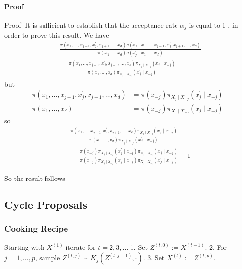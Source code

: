 \documentclass{article}
\begin{document}
\paragraph{Proof}
Proof. It is sufficient to establish that the acceptance rate $\alpha_j$ is equal to 1 , in order to prove this result. We have
$$
\begin{aligned}
& \frac{\pi\left(x_1, \ldots, x_{j-1}, x_j^{\prime}, x_{j+1}, \ldots, x_d\right) q\left(x_j \mid x_1, \ldots, x_{j-1}, x_j^{\prime}, x_{j+1}, \ldots, x_d\right)}{\pi\left(x_1, \ldots, x_d\right) q\left(x_j^{\prime} \mid x_1, \ldots, x_d\right)} \\
& =\frac{\pi\left(x_1, \ldots, x_{j-1}, x_j^{\prime}, x_{j+1}, \ldots, x_d\right) \pi_{X_j \mid X_{-j}}\left(x_j \mid x_{-j}\right)}{\pi\left(x_1, \ldots, x_d\right) \pi_{X_j \mid X_{-j}}\left(x_j^{\prime} \mid x_{-j}\right)}
\end{aligned}
$$
but
$$
\begin{aligned}
\pi\left(x_1, \ldots, x_{j-1}, x_j^{\prime}, x_{j+1}, \ldots, x_d\right) & =\pi\left(x_{-j}\right) \pi_{X_j \mid X_{-j}}\left(x_j^{\prime} \mid x_{-j}\right) \\
\pi\left(x_1, \ldots, x_d\right) & =\pi\left(x_{-j}\right) \pi_{X_j \mid X_{-j}}\left(x_j \mid x_{-j}\right)
\end{aligned}
$$
so
$$
\begin{aligned}
& \frac{\pi\left(x_1, \ldots, x_{j-1}, x_j^{\prime}, x_{j+1}, \ldots, x_d\right) \pi_{X_j \mid X_{-j}}\left(x_j \mid x_{-j}\right)}{\pi\left(x_1, \ldots, x_d\right) \pi_{X_j \mid X_{-j}}\left(x_j^{\prime} \mid x_{-j}\right)} \\
& =\frac{\pi\left(x_{-j}\right) \pi_{X_j \mid X_{-j}}\left(x_j^{\prime} \mid x_{-j}\right) \pi_{X_j \mid X_{-j}}\left(x_j \mid x_{-j}\right)}{\pi\left(x_{-j}\right) \pi_{X_j \mid X_{-j}}\left(x_j \mid x_{-j}\right) \pi_{X_j \mid X_{-j}}\left(x_j^{\prime} \mid x_{-j}\right)}=1
\end{aligned}
$$

So the result follows.
\subsection{Cycle Proposals}
\subsubsection{Cooking Recipe}
Starting with $X^{(1)}$ iterate for $t=2,3, \ldots$
1. Set $Z^{(t, 0)}:=X^{(t-1)}$.
2. For $j=1, \ldots, p$, sample $Z^{(t, j)} \sim K_j\left(Z^{(t, j-1)}, \cdot\right)$.
3. Set $X^{(t)}:=Z^{(t, p)}$.
\end{document}
